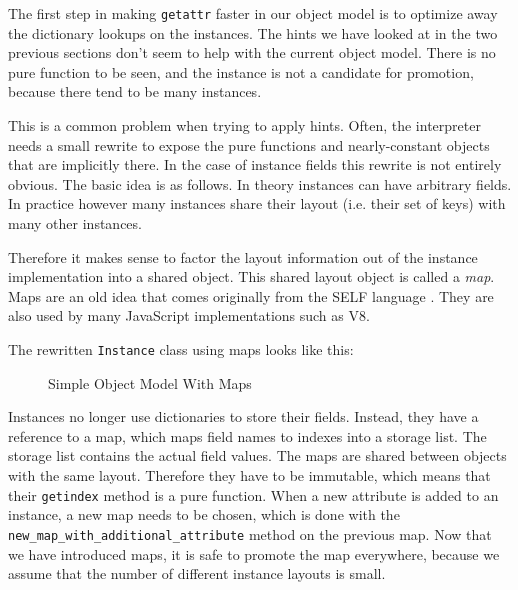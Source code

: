 \documentclass{sig-alternate}
\let\oldcite=\cite
\renewcommand\cite[1]{\ifthenelse{\equal{#1}{XXX}}{[citation~needed]}{\oldcite{#1}}}
\begin{document}
The first step in making \texttt{getattr} faster in our object model is to optimize
away the dictionary lookups on the instances. The hints we have looked at in the
two previous sections don't seem to help with the current object model. There is
no pure function to be seen, and the instance is not a candidate for promotion,
because there tend to be many instances.

This is a common problem when trying to apply hints. Often, the interpreter
needs a small rewrite to expose the pure functions and nearly-constant objects
that are implicitly there. In the case of instance fields this rewrite is not
entirely obvious. The basic idea is as follows. In theory instances can have
arbitrary fields. In practice however many instances share their layout (i.e.
their set of keys) with many other instances.

Therefore it makes sense to factor the layout information out of the instance
implementation into a shared object. This shared layout object is called a
\emph{map}. Maps are an old idea that comes originally from the SELF language \cite{XXX}. They are
also used by many JavaScript implementations such as V8.

The rewritten \texttt{Instance} class using maps looks like this:

\begin{figure}

\caption{Simple Object Model With Maps}
\label{fig:maps}
\end{figure}

Instances no longer use dictionaries to store their fields. Instead, they have a
reference to a map, which maps field names to indexes into a storage list. The
storage list contains the actual field values. The maps are shared between
objects with the same layout. Therefore they have to be immutable, which means
that their \texttt{getindex} method is a pure function. When a new attribute is added
to an instance, a new map needs to be chosen, which is done with the
\texttt{new\_map\_with\_additional\_attribute} method on the previous map. Now that we have
introduced maps, it is safe to promote the map everywhere, because we assume
that the number of different instance layouts is small.
\end{document}
